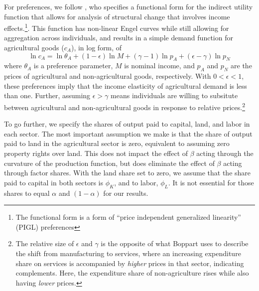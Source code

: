 \documentclass[11pt]{article}
\begin{document}
For preferences, we follow \cite{boppart2014}, who specifies a functional form for the indirect utility function that allows for analysis of structural change that involves income effects.\footnote{The functional form is a form of ``price independent generalized linearity'' (PIGL) preferences}. This function has non-linear Engel curves while still allowing for aggregation across individuals, and results in a simple demand function for agricultural goods ($c_A$), in log form, of
\begin{equation}
    \ln c_A = \ln \theta_A + (1-\epsilon) \ln M + (\gamma - 1) \ln p_A + (\epsilon - \gamma) \ln p_N \label{EQ_ca_demand}
\end{equation}
where $\theta_A$ is a preference parameter, $M$ is nominal income, and $p_A$ and $p_N$ are the prices of agricultural and non-agricultural goods, respectively. With $0 < \epsilon < 1$, these preferences imply that the income elasticity of agricultural demand is less than one. Further, assuming $\epsilon > \gamma$ means individuals are willing to subsitute between agricultural and non-agricultural goods in response to relative prices.\footnote{The relative size of $\epsilon$ and $\gamma$ is the opposite of what Boppart uses to describe the shift from manufacturing to services, where an increasing expenditure share on services is accompanied by \textit{higher} prices in that sector, indicating complements. Here, the expenditure share of non-agriculture rises while also having \textit{lower} prices.}

To go further, we specify the shares of output paid to capital, land, and labor in each sector. The most important assumption we make is that the share of output paid to land in the agricultural sector is zero, equivalent to assuming zero property rights over land. This does not impact the effect of $\beta$ acting through the curvature of the production function, but does eliminate the effect of $\beta$ acting through factor shares. With the land share set to zero, we assume that the share paid to capital in both sectors is $\phi_K$, and to labor, $\phi_L$. It is not essential for those shares to equal $\alpha$ and $(1-\alpha)$ for our results.
\end{document}
